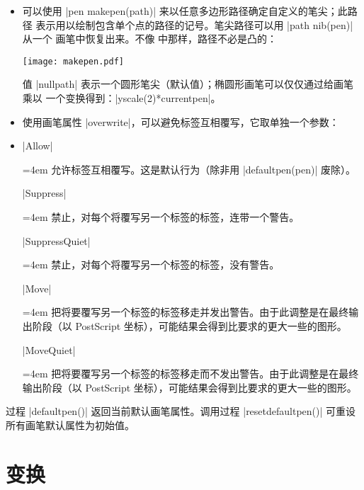 \documentclass[nofonts,CJKnormalspaces]{ctexbook}[2009/05/20]
\newenvironment{funclist}{\trivlist
  \parindent=0pt
\item[]
  \def\item{\medskip\par\leftskip=0pt}
  \def\go{\par\leftskip=4em}}
{\endtrivlist}
\newcommand*\prgname[1]{\textsf{#1}}
\begin{document}
\begin{itemize}
\item 可以使用 |pen makepen(path)| 来以任意多边形路径确定自定义的笔尖；此路径
  表示用以绘制包含单个点的路径的记号。笔尖路径可以用 |path nib(pen)| 从一个
  画笔中恢复出来。不像 \MP{} 中那样，路径不必是凸的：

\begin{center}
  \texttt{[image: makepen.pdf]}
\end{center}

  值 |nullpath| 表示一个圆形笔尖（默认值）；椭圆形画笔可以仅仅通过给画笔乘以
  一个变换得到：|yscale(2)*currentpen|。

\item 使用画笔属性 |overwrite|，可以避免标签互相覆写，它取单独一个参数：
\begin{funclist}
\item |Allow| \go
  允许标签互相覆写。这是默认行为（除非用 |defaultpen(pen)| 废除）。

\item |Suppress| \go
  禁止，对每个将覆写另一个标签的标签，连带一个警告。

\item |SuppressQuiet| \go
  禁止，对每个将覆写另一个标签的标签，没有警告。

\item |Move| \go
  把将要覆写另一个标签的标签移走并发出警告。由于此调整是在最终输出阶段（以
  \prgname{PostScript} 坐标），可能结果会得到比要求的更大一些的图形。

\item |MoveQuiet| \go
  把将要覆写另一个标签的标签移走而不发出警告。由于此调整是在最终输出阶段（以
  \prgname{PostScript} 坐标），可能结果会得到比要求的更大一些的图形。
\end{funclist}
\end{itemize}

过程 |defaultpen()| 返回当前默认画笔属性。调用过程 |resetdefaultpen()| 可重设
所有画笔默认属性为初始值。



\section{变换}
\label{sec:transforms}
\end{document}
